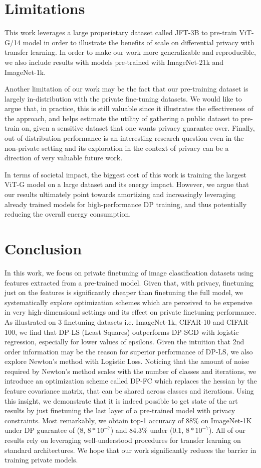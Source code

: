\documentclass[letterpaper]{article} \usepackage{fullpage}
\begin{document}
 
\section{Limitations}
This work leverages a large properietary dataset called JFT-3B to pre-train ViT-G/14 model in order to illustrate the benefits of scale on differential privacy with transfer learning. In order to make our work more generalizable and reproducible, we also include results with models pre-trained with ImageNet-21k and ImageNet-1k. 

Another limitation of our work may be the fact that our pre-training dataset is largely in-distribution with the private fine-tuning datasets. We would like to argue that, in practice, this is still valuable since it illustrates the effectiveness of the approach, and helps estimate the utility of gathering a public dataset to pre-train on, given a sensitive dataset that one wants privacy guarantee over. Finally, out of distribution performance is an interesting research question even in the non-private setting and its exploration in the context of privacy can be a direction of very valuable future work. 


In terms of societal impact, the biggest cost of this work is training the largest ViT-G model on a large dataset and its energy impact. However, we argue that our results ultimately point towards amortizing and increasingly leveraging already trained models for high-performance DP training, and thus potentially reducing the overall energy consumption.

\section{Conclusion}
In this work, we focus on private finetuning of image classification datasets using features extracted from a pre-trained model. Given that, with privacy, finetuning just on the features is significantly cheaper than finetuning the full model, we systematically explore optimization schemes which are perceived to be expensive in very high-dimensional settings and its effect on private finetuning performance. As illustrated on 3 finetuning datasets i.e. ImageNet-1k, CIFAR-10 and CIFAR-100, we find that DP-LS (Least Squares) outperforms DP-SGD with logistic regression, especially for lower values of epsilons. Given the intuition that 2nd order information may be the reason for superior performance of DP-LS, we also explore Newton's method with Logistic Loss. Noticing that the amount of noise required by Newton's method scales with the number of classes and iterations, we introduce an optimization scheme called DP-FC which replaces the hessian by the feature covariance matrix, that can be shared across classes and iterations. Using this insight, we demonstrate that it is indeed possible to get state of the art results by just finetuning the last layer of a pre-trained model with privacy constraints. Most remarkably, we obtain top-1 accuracy of 88\% on ImageNet-1K under DP guarantee of (8, $8 * 10^{-7}$) and 84.3\% under (0.1, $8 * 10^{-7}$). All of our results rely on leveraging well-understood procedures for transfer learning on standard architectures. We hope that our work significantly reduces the barrier in training private models.
\end{document}
